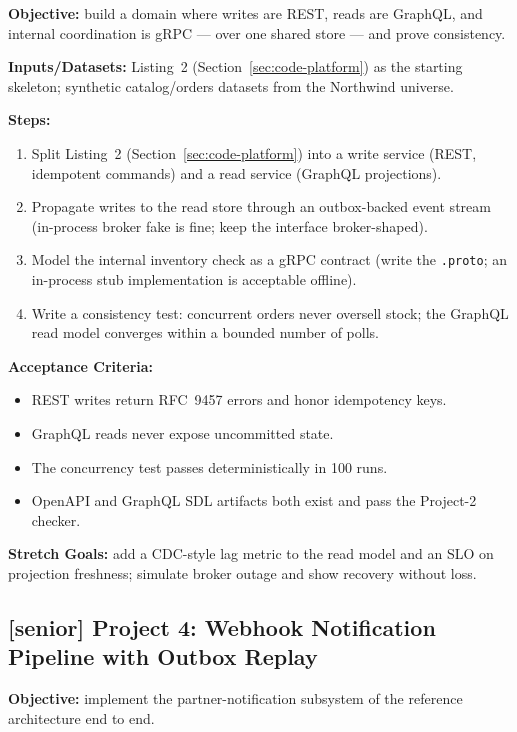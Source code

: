 \textbf{Objective:} build a domain where writes are REST, reads are GraphQL,
and internal coordination is gRPC --- over one shared store --- and prove
consistency.

\textbf{Inputs/Datasets:} Listing~2 (Section~\ref{sec:code-platform}) as the starting
skeleton; synthetic catalog/orders datasets from the Northwind universe.

\textbf{Steps:}
\begin{enumerate}
  \item Split Listing~2 (Section~\ref{sec:code-platform}) into a write service (REST,
        idempotent commands) and a read service (GraphQL projections).
  \item Propagate writes to the read store through an outbox-backed event
        stream (in-process broker fake is fine; keep the interface
        broker-shaped).
  \item Model the internal inventory check as a gRPC contract (write the
        \texttt{.proto}; an in-process stub implementation is acceptable
        offline).
  \item Write a consistency test: concurrent orders never oversell stock;
        the GraphQL read model converges within a bounded number of polls.
\end{enumerate}

\textbf{Acceptance Criteria:}
\begin{itemize}
  \item[$\square$] REST writes return RFC~9457 errors and honor idempotency
        keys.
  \item[$\square$] GraphQL reads never expose uncommitted state.
  \item[$\square$] The concurrency test passes deterministically in 100
        runs.
  \item[$\square$] OpenAPI and GraphQL SDL artifacts both exist and pass
        the Project-2 checker.
\end{itemize}

\textbf{Stretch Goals:} add a CDC-style lag metric to the read model and an
SLO on projection freshness; simulate broker outage and show recovery
without loss.

\subsection{[senior] Project 4: Webhook Notification Pipeline with Outbox Replay}

\textbf{Objective:} implement the partner-notification subsystem of the
reference architecture end to end.

